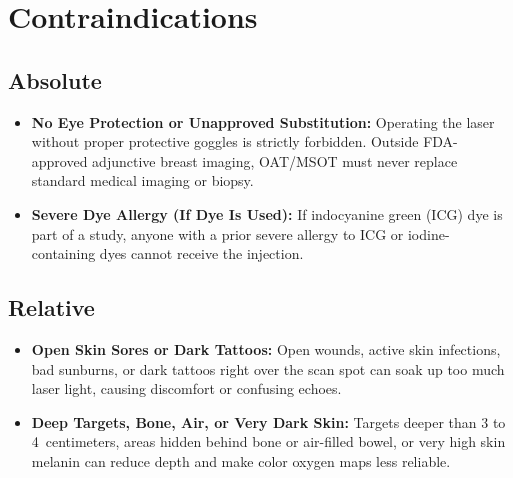 \section{Contraindications}

\subsection{Absolute}
\begin{itemize}
  \item \textbf{No Eye Protection or Unapproved Substitution:} Operating the laser without proper protective goggles is strictly forbidden. Outside FDA-approved adjunctive breast imaging, OAT/MSOT must never replace standard medical imaging or biopsy.
  \item \textbf{Severe Dye Allergy (If Dye Is Used):} If indocyanine green (ICG) dye is part of a study, anyone with a prior severe allergy to ICG or iodine-containing dyes cannot receive the injection.
\end{itemize}

\subsection{Relative}
\begin{itemize}
  \item \textbf{Open Skin Sores or Dark Tattoos:} Open wounds, active skin infections, bad sunburns, or dark tattoos right over the scan spot can soak up too much laser light, causing discomfort or confusing echoes.
  \item \textbf{Deep Targets, Bone, Air, or Very Dark Skin:} Targets deeper than 3 to 4~centimeters, areas hidden behind bone or air-filled bowel, or very high skin melanin can reduce depth and make color oxygen maps less reliable.
\end{itemize}

